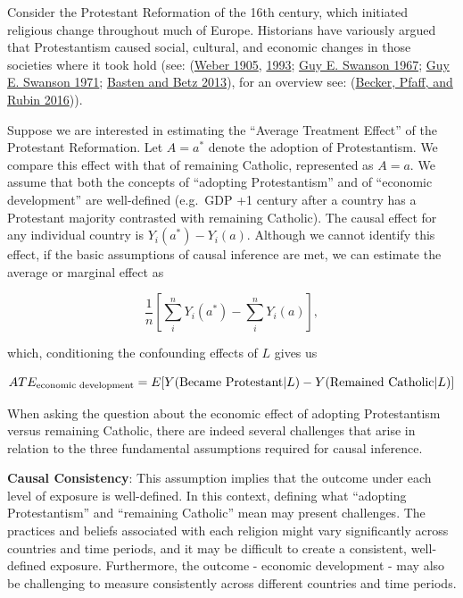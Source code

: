 \documentclass[
  singlecolumn]{article}
\begin{document}
Consider the Protestant Reformation of the 16th century, which initiated
religious change throughout much of Europe. Historians have variously
argued that Protestantism caused social, cultural, and economic changes
in those societies where it took hold (see:
(\protect\hyperlink{ref-weber1905}{Weber 1905},
\protect\hyperlink{ref-weber1993}{1993};
\protect\hyperlink{ref-swanson1967}{Guy E. Swanson 1967};
\protect\hyperlink{ref-swanson1971}{Guy E. Swanson 1971};
\protect\hyperlink{ref-basten2013}{Basten and Betz 2013}), for an
overview see: (\protect\hyperlink{ref-becker2016}{Becker, Pfaff, and
Rubin 2016})).

Suppose we are interested in estimating the ``Average Treatment Effect''
of the Protestant Reformation. Let \(A = a^*\) denote the adoption of
Protestantism. We compare this effect with that of remaining Catholic,
represented as \(A = a\). We assume that both the concepts of ``adopting
Protestantism'' and of ``economic development'' are well-defined
(e.g.~GDP +1 century after a country has a Protestant majority
contrasted with remaining Catholic). The causal effect for any
individual country is \(Y_i(a^*) - Y_i(a)\). Although we cannot identify
this effect, if the basic assumptions of causal inference are met, we
can estimate the average or marginal effect as

\[\frac{1}{n} \left[\sum_i^{n} Y_i(a^*) - \sum_i^{n} Y_i(a)\right],\]

which, conditioning the confounding effects of \(L\) gives us

\[ATE_{\textnormal{economic~development}} = E[Y(\textnormal{Became~Protestant}|L) - Y(\textnormal{Remained~Catholic}|L)]\]

When asking the question about the economic effect of adopting
Protestantism versus remaining Catholic, there are indeed several
challenges that arise in relation to the three fundamental assumptions
required for causal inference.

\textbf{Causal Consistency}: This assumption implies that the outcome
under each level of exposure is well-defined. In this context, defining
what ``adopting Protestantism'' and ``remaining Catholic'' mean may
present challenges. The practices and beliefs associated with each
religion might vary significantly across countries and time periods, and
it may be difficult to create a consistent, well-defined exposure.
Furthermore, the outcome - economic development - may also be
challenging to measure consistently across different countries and time
periods.
\end{document}
